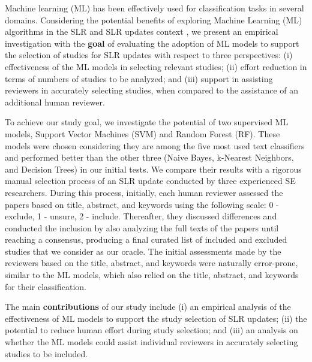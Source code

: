 Machine learning (ML) has been effectively used for classification tasks in several domains.
Considering the potential benefits of exploring Machine Learning (ML) algorithms in the SLR and SLR updates context \cite{Napoleao2021, Watanabe20}, we present an empirical investigation with the \textbf{goal} of evaluating the adoption of ML models to support the selection of studies for SLR updates with respect to three perspectives: (i) effectiveness of the ML models in selecting relevant studies; (ii) effort reduction in terms of numbers of studies to be analyzed; and (iii) support in assisting reviewers in accurately selecting studies, when compared to the assistance of an additional human reviewer.

To achieve our study goal, we investigate the potential of two supervised ML models, Support Vector Machines (SVM) and Random Forest (RF). These models were chosen considering they are among the five most used text classifiers \cite{pintas2021feature} and performed better than the other three (Naive Bayes, k-Nearest Neighbors, and Decision Trees) in our initial tests. We compare their results with a rigorous manual selection process of an SLR update conducted by three experienced SE researchers. During this process, initially, each human reviewer assessed the papers based on title, abstract, and keywords using the following scale: 0 - exclude, 1 - unsure, 2 - include. Thereafter, they discussed differences and conducted the inclusion by also analyzing the full texts of the papers until reaching a consensus, producing a final curated list of included and excluded studies that we consider as our oracle. The initial assessments made by the reviewers based on the title, abstract, and keywords were naturally error-prone, similar to the ML models, which also relied on the title, abstract, and keywords for their classification. 


The main \textbf{contributions} of our study include (i) an empirical analysis of the effectiveness of ML models to support the study selection of SLR updates; (ii) the potential to reduce human effort during study selection; and (iii) an analysis on whether the ML models could assist individual reviewers in accurately selecting studies to be included.

